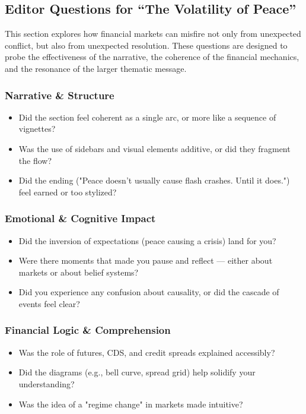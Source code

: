 \subsection{Editor Questions for ``The Volatility of Peace''}

This section explores how financial markets can misfire not only from unexpected conflict, but also from unexpected resolution. These questions are designed to probe the effectiveness of the narrative, the coherence of the financial mechanics, and the resonance of the larger thematic message.

\subsubsection{Narrative \& Structure}
\begin{itemize}
  \item Did the section feel coherent as a single arc, or more like a sequence of vignettes?
  \item Was the use of sidebars and visual elements additive, or did they fragment the flow?
  \item Did the ending ("Peace doesn’t usually cause flash crashes. Until it does.") feel earned or too stylized?
\end{itemize}

\subsubsection{Emotional \& Cognitive Impact}
\begin{itemize}
  \item Did the inversion of expectations (peace causing a crisis) land for you?
  \item Were there moments that made you pause and reflect — either about markets or about belief systems?
  \item Did you experience any confusion about causality, or did the cascade of events feel clear?
\end{itemize}

\subsubsection{Financial Logic \& Comprehension}
\begin{itemize}
  \item Was the role of futures, CDS, and credit spreads explained accessibly?
  \item Did the diagrams (e.g., bell curve, spread grid) help solidify your understanding?
  \item Was the idea of a "regime change" in markets made intuitive?
\end{itemize}

